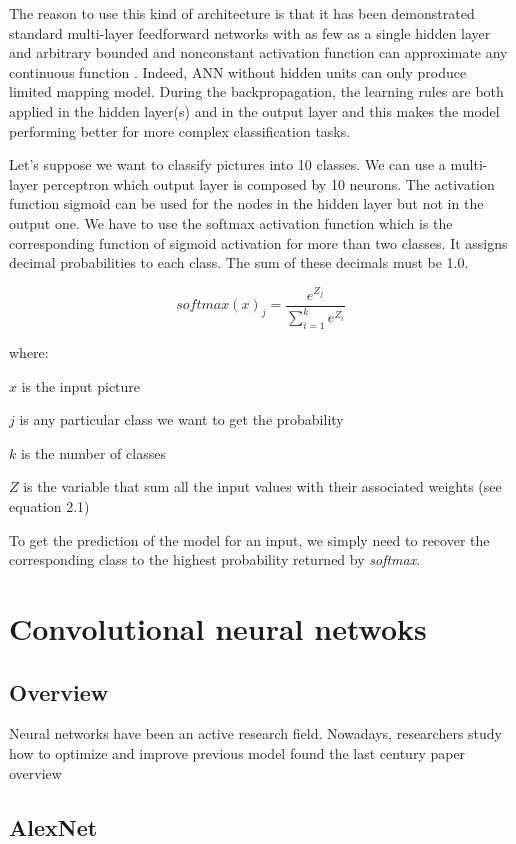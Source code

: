 The reason to use this kind of architecture is that it has been demonstrated standard multi-layer feedforward networks with as few as a single hidden layer and arbitrary bounded and nonconstant activation function can approximate any continuous function \cite{multi}.
Indeed, ANN without hidden units can only produce limited mapping model. During the backpropagation, the learning rules are both applied in the hidden layer(s) and in the output layer and this makes the model performing better for more complex classification tasks.

Let's suppose we want to classify pictures into 10 classes. We can use a multi-layer perceptron which output layer is composed by 10 neurons. The activation function sigmoid can be used for the nodes in the hidden layer but not in the output one. We have to use the softmax activation function which is the corresponding function of sigmoid activation for more than two classes. It assigns decimal probabilities to each class. The sum of these decimals must be 1.0. 

\begin{equation}
{softmax(x)_{j}}=\frac{e^{{Z}_{j}}}{\sum_{i=1}^k e^{Z_{i}} }
\end{equation}

where:

${x}$ is the input picture

${j}$ is any particular class we want to get the probability

${k}$ is the number of classes

${Z}$ is the variable that sum all the input values with their associated weights (see equation 2.1) 

To get the prediction of the model for an input, we simply need to recover the corresponding class to the highest probability returned by \emph{softmax}.

 

\section{Convolutional neural netwoks}
\subsection{Overview}
Neural networks have been an active research field. Nowadays, researchers study how to optimize and improve previous model found the last century  paper overview
\subsection {AlexNet}
